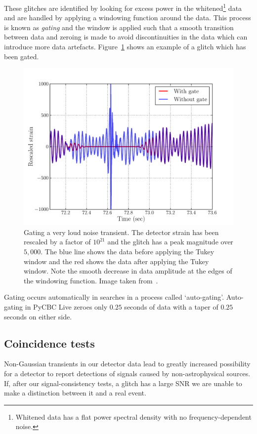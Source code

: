 These glitches are identified by looking for excess power in the whitened\footnote{Whitened data has a flat power spectral density with no frequency-dependent noise.} data and are handled by applying a windowing function around the data. This process is known as \textit{gating} and the window is applied such that a smooth transition between data and zeroing is made to avoid discontinuities in the data which can introduce more data artefacts. Figure~\ref{2:fig:autogating} shows an example of a glitch which has been gated.
%
\begin{figure}
    \centering
    \includegraphics[width=0.9\linewidth]{images/2_searches/autogating.pdf}
    \caption{Gating a very loud noise transient. The detector strain has been rescaled by a factor of $10^{21}$ and the glitch has a peak magnitude over $5,000$. The blue line shows the data before applying the Tukey window and the red shows the data after applying the Tukey window. Note the smooth decrease in data amplitude at the edges of the windowing function. Image taken from~\cite{PyCBC:2016}.}
    \label{2:fig:autogating}
\end{figure}
%

Gating occurs automatically in \gwadj searches in a process called `auto-gating'. Auto-gating in PyCBC Live zeroes only $0.25$ seconds of data with a taper of $0.25$ seconds on either side.

\subsection{\label{2:sec:coincidence-test}Coincidence tests}

Non-Gaussian transients in our detector data lead to greatly increased possibility for a \gwadj detector to report detections of \gwadj signals caused by non-astrophysical sources. If, after our signal-consistency tests, a glitch has a large SNR we are unable to make a distinction between it and a real event.

